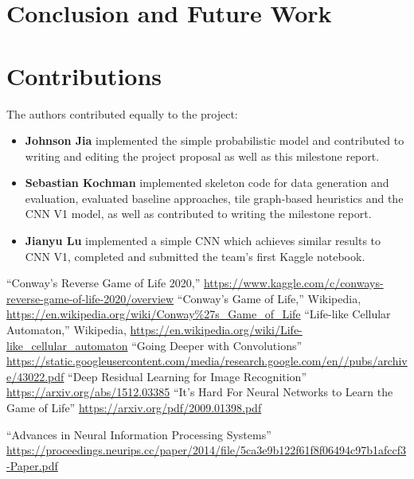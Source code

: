 \documentclass[conference]{IEEEtran}
\begin{document}
\section{Conclusion and Future Work}

\section{Contributions}
The authors contributed equally to the project: %
\begin{itemize}
    \item \textbf{Johnson Jia} implemented the simple probabilistic model and contributed to writing and editing the project proposal as well as this milestone report.

    \item \textbf{Sebastian Kochman} implemented skeleton code for data generation and evaluation, evaluated baseline approaches, tile graph-based heuristics and the CNN V1 model, as well as contributed to writing the milestone report.

    \item \textbf{Jianyu Lu} implemented a simple CNN which achieves similar results to CNN V1, completed and submitted the team's first Kaggle notebook.

\end{itemize}

\begin{thebibliography}{00}         
 ``Conway's Reverse Game of Life 2020,'' \url{https://www.kaggle.com/c/conways-reverse-game-of-life-2020/overview}
 ``Conway's Game of Life,'' Wikipedia, \url{https://en.wikipedia.org/wiki/Conway\%27s_Game_of_Life}
 ``Life-like Cellular Automaton,'' Wikipedia, \url{https://en.wikipedia.org/wiki/Life-like_cellular_automaton}
 ``Going Deeper with Convolutions'' \url{https://static.googleusercontent.com/media/research.google.com/en//pubs/archive/43022.pdf}
 ``Deep Residual Learning for Image Recognition''
\url{https://arxiv.org/abs/1512.03385}
 ``It’s Hard For Neural Networks to Learn the Game of
Life''
\url{https://arxiv.org/pdf/2009.01398.pdf}

 ``Advances in Neural Information Processing Systems''
\url{https://proceedings.neurips.cc/paper/2014/file/5ca3e9b122f61f8f06494c97b1afccf3-Paper.pdf}
\author[]{Goodfellow, Ian and Pouget-Abadie, Jean and Mirza, Mehdi and Xu, Bing and Warde-Farley, David and Ozair, Sherjil and Courville, Aaron and Bengio, Yoshua}

\iffalse
@misc{goodfellow2014generative,
      title={Generative Adversarial Networks}, 
      author={Ian J. Goodfellow and Jean Pouget-Abadie and Mehdi Mirza and Bing Xu and David Warde-Farley and Sherjil Ozair and Aaron Courville and Yoshua Bengio},
      year={2014},
      eprint={1406.2661},
      archivePrefix={arXiv},
      primaryClass={stat.ML}
}
\fi

\end{thebibliography}
\end{document}
